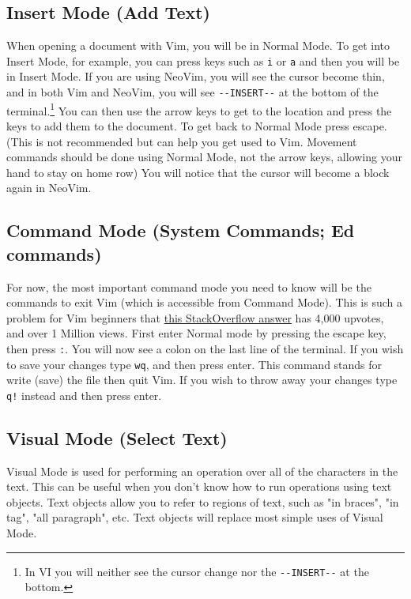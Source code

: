 \documentclass[11pt]{article}
\begin{document}
\subsection{Insert Mode (Add Text)}
\label{sec:orgbd04e93}
When opening a document with Vim, you will be in Normal Mode. To get into Insert
Mode, for example, you can press keys such as \texttt{i} or \texttt{a} and then you will be in
Insert Mode. If you are using NeoVim, you will see the cursor become thin, and
in both Vim and NeoVim, you will see \texttt{-{}-INSERT-{}-} at the bottom of the
terminal.\footnote{In VI you will neither see the cursor change nor the 
\texttt{-{}-INSERT-{}-} at the bottom.} You can then use the arrow keys to get to the location and press
the keys to add them to the document. To get back to Normal Mode press escape.
(This is not recommended but can help you get used to Vim. Movement commands
should be done using Normal Mode, not the arrow keys, allowing your hand to stay
on home row) You will notice that the cursor will become a block again in
NeoVim.
\subsection{Command Mode (System Commands; Ed commands)}
\label{sec:orgaa5fa84}
For now, the most important command mode you need to know will be the commands
to exit Vim (which is accessible from Command Mode). This is such a problem for
Vim beginners that \href{https://stackoverflow.com/questions/11828270/how-to-exit-the-vim-editor}{this StackOverflow answer} has 4,000 upvotes, and over 1
Million views. First enter Normal mode by pressing the escape key, then press
\texttt{:}. You will now see a colon on the last line of the terminal. If you wish to
save your changes type \texttt{wq}, and then press enter. This command stands for write
(save) the file then quit Vim. If you wish to throw away your changes type \texttt{q!}
instead and then press enter.
\subsection{Visual Mode (Select Text)}
\label{sec:orgce151b1}
Visual Mode is used for performing an operation over all of the characters in
the text. This can be useful when you don't know how to run operations using
text objects. Text objects allow you to refer to regions of text, such as "in
braces", "in tag", "all paragraph", etc. Text objects will replace most simple
uses of Visual Mode.
\end{document}
